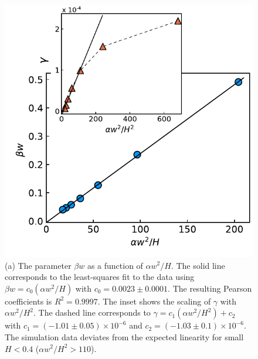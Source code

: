 \documentclass[aps,pre,
superscriptaddress,
twocolumn,
notitlepage,
10pt,
]{revtex4-1}
\begin{document}
\begin{figure}[!h] %
	\centering %
	\includegraphics[width=0.99\columnwidth]{fig5.pdf} 
	\caption{(a) The parameter $\beta w$ as a function of $ \alpha w^2/H$. 
		The solid line corresponds to the least-squares fit to the data using 
		$\beta w = c_0 \left(\alpha w^2/H\right) $ with $ c_0=0.0023 \pm 0.0001$. 
		The resulting Pearson coefficients is $ R^2 = 0.9997 $. The inset shows the scaling of
		$\gamma$ with $\alpha w^2/H^2$. The dashed line corresponds to $ \gamma = c_1
		\left(\alpha w^2/H^2\right) + c_2$ with $c_1 = (-1.01\pm0.05)\times10^{-6}$
		and $c_2 = (-1.03\pm0.1)\times10^{-6}$. The simulation data deviates from the
		expected linearity for small $H<0.4$ ($\alpha w^2/H^2 > 110$).} 
	\label{fig5} %
\end{figure}
\end{document}
